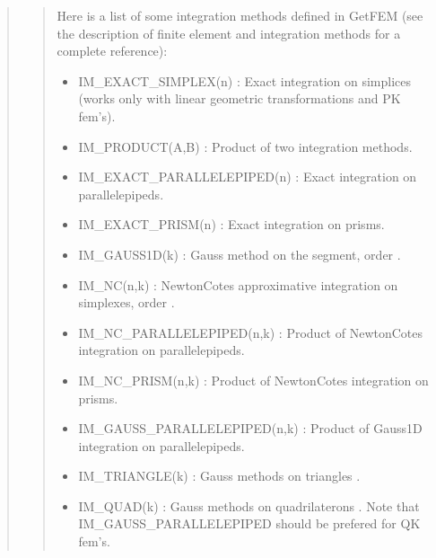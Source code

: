 \documentclass[a4paper,11pt,english]{sphinxmanual}
\begin{document}
\sphinxAtStartPar
{}
\begin{quote}

\sphinxAtStartPar
{}
\begin{quote}

\sphinxAtStartPar
Here is a list of some integration methods defined in GetFEM (see the
description of finite element and integration methods for a complete
reference):
\begin{itemize}
\item {} 
\sphinxAtStartPar
IM\_EXACT\_SIMPLEX(n) :
Exact integration on simplices (works only with linear geometric
transformations and PK fem’s).

\item {} 
\sphinxAtStartPar
IM\_PRODUCT(A,B) :
Product of two integration methods.

\item {} 
\sphinxAtStartPar
IM\_EXACT\_PARALLELEPIPED(n) :
Exact integration on parallelepipeds.

\item {} 
\sphinxAtStartPar
IM\_EXACT\_PRISM(n) :
Exact integration on prisms.

\item {} 
\sphinxAtStartPar
IM\_GAUSS1D(k) :
Gauss method on the segment, order .

\item {} 
\sphinxAtStartPar
IM\_NC(n,k) :
Newton\sphinxhyphen{}Cotes approximative integration on simplexes, order .

\item {} 
\sphinxAtStartPar
IM\_NC\_PARALLELEPIPED(n,k) :
Product of Newton\sphinxhyphen{}Cotes integration on parallelepipeds.

\item {} 
\sphinxAtStartPar
IM\_NC\_PRISM(n,k) :
Product of Newton\sphinxhyphen{}Cotes integration on prisms.

\item {} 
\sphinxAtStartPar
IM\_GAUSS\_PARALLELEPIPED(n,k) :
Product of Gauss1D integration on parallelepipeds.

\item {} 
\sphinxAtStartPar
IM\_TRIANGLE(k) :
Gauss methods on triangles .

\item {} 
\sphinxAtStartPar
IM\_QUAD(k) :
Gauss methods on quadrilaterons . Note that
IM\_GAUSS\_PARALLELEPIPED should be prefered for QK fem’s.


\end{itemize}
\end{quote}
\end{quote}
\end{document}
